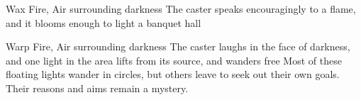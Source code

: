 \ifodd\value{diceNo}

  {}%
  {Wax}%
  {Fire, Air}%
  {surrounding darkness}%
  {The caster speaks encouragingly to a flame, and it blooms enough to light a banquet hall}%
  {}

\else

  {}%
  {Warp}%
  {Fire, Air}%
  {surrounding darkness}%
  {The caster laughs in the face of darkness, and one light in the area lifts from its source, and wanders free}%
  {Most of these floating lights wander in circles, but others leave to seek out their own goals.
  Their reasons and aims remain a mystery.}

\fi
{}
